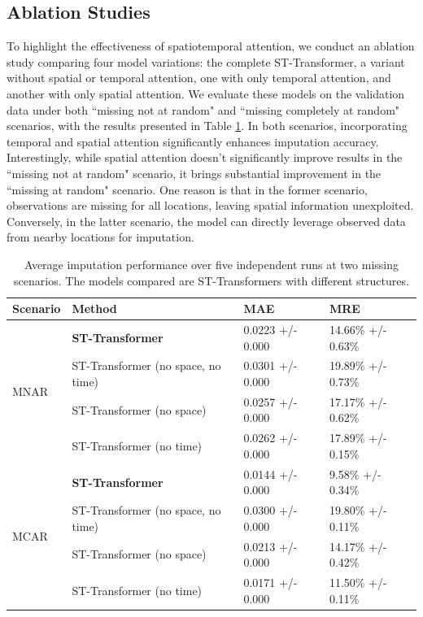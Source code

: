 \documentclass[11pt]{article}
\begin{document}
\subsection{Ablation Studies}

To highlight the effectiveness of spatiotemporal attention, we conduct an ablation study comparing four model variations: the complete ST-Transformer, a variant without spatial or temporal attention, one with only temporal attention, and another with only spatial attention. We evaluate these models on the validation data under both ``missing not at random" and ``missing completely at random" scenarios, with the results presented in Table \ref{tab: ablation_study_1}. In both scenarios, incorporating temporal and spatial attention significantly enhances imputation accuracy. Interestingly, while spatial attention doesn't significantly improve results in the ``missing not at random" scenario, it brings substantial improvement in the ``missing at random" scenario. One reason is that in the former scenario, observations are missing for all locations, leaving spatial information unexploited. Conversely, in the latter scenario, the model can directly leverage observed data from nearby locations for imputation.

\begin{table}[h!]
    \centering
    \begin{tabularx}{\textwidth}{XXXX}
        \toprule
         Scenario&Method & MAE & MRE \\
        \midrule
        \multirow{4}{*}{MNAR}&\textbf{ST-Transformer} & 0.0223 +/- 0.000 & 14.66\% +/- 0.63\%  \\
        &ST-Transformer (no space, no time) & 0.0301 +/- 0.000& 19.89\% +/- 0.73\%\\
        &ST-Transformer (no space) & 0.0257 +/- 0.000& 17.17\% +/- 0.62\% \\
        &ST-Transformer (no time) & 0.0262 +/- 0.000 & 17.89\% +/- 0.15\% \\
        \midrule
        \multirow{4}{*}{MCAR}&\textbf{ST-Transformer} & 0.0144 +/- 0.000 & 9.58\% +/- 0.34\%  \\
        &ST-Transformer (no space, no time) & 0.0300 +/- 0.000& 19.80\% +/- 0.11\%\\
        &ST-Transformer (no space) & 0.0213 +/- 0.000& 14.17\% +/- 0.42\% \\
        &ST-Transformer (no time) & 0.0171 +/- 0.000 & 11.50\% +/- 0.11\% \\
        \bottomrule

    \end{tabularx}
    \caption{Average imputation performance over five independent runs at two missing scenarios. The models compared are ST-Transformers with different structures.}
    \label{tab: ablation_study_1}
\end{table}
\end{document}
